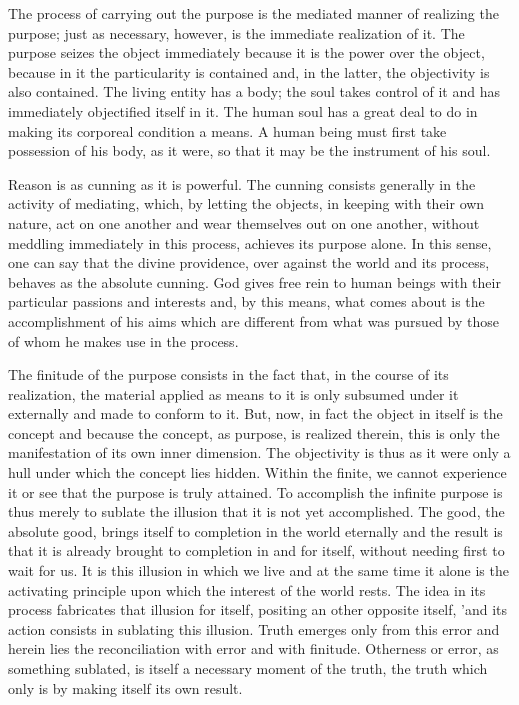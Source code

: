 The process of carrying out the purpose is
the mediated manner of realizing the purpose;
just as necessary, however, is the immediate realization of it.
The purpose seizes the object immediately
because it is the power over the object,
because in it the particularity is contained and,
in the latter, the objectivity is also contained.
The living entity has a body;
the soul takes control of it
and has immediately objectified itself in it.
The human soul has a great deal to do in making its corporeal condition a means.
A human being must first take possession of his body, as it were,
so that it may be the instrument of his soul.

Reason is as cunning as it is powerful. The cunning consists generally
in the activity of mediating, which, by letting the objects, in keeping with their
own nature, act on one another and wear themselves out on one another, without
meddling immediately in this process, achieves its purpose alone. In this sense, one
can say that the divine providence, over against the world and its process, behaves
as the absolute cunning. God gives free rein to human beings with their particular
passions and interests and, by this means, what comes about is the accomplishment
of his aims which are different from what was pursued by those of whom he makes
use in the process.

The finitude of the purpose consists in the fact that, in the course
of its realization, the material applied as means to it is only subsumed under it
externally and made to conform to it. But, now, in fact the object in itself is the
concept and because the concept, as purpose, is realized therein, this is only the
manifestation of its own inner dimension. The objectivity is thus as it were only a
hull under which the concept lies hidden. Within the finite, we cannot experience
it or see that the purpose is truly attained. To accomplish the infinite purpose is
thus merely to sublate the illusion that it is not yet accomplished. The
good, the absolute good, brings itself to completion in the world eternally and the
result is that it is already brought to completion in and for itself, without needing
first to wait for us. It is this illusion in which we live and at the same time it alone
is the activating principle upon which the interest of the world rests. The idea in
its process fabricates that illusion for itself, positing an other opposite itself, 'and
its action consists in sublating this illusion. Truth emerges only from this error
and herein lies the reconciliation with error and with finitude. Otherness or error,
as something sublated, is itself a necessary moment of the truth, the truth which
only is by making itself its own result.

